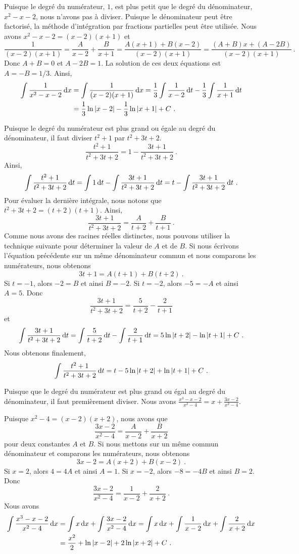{
Puisque le degré du numérateur, $1$, est plus petit que le degré du
dénominateur, $x^2-x -2$, nous n'avons pas à diviser.
Puisque le dénominateur peut être factorisé, la méthode d'intégration
par fractions partielles peut être utilisée.  Nous avons
$x^2 -x -2 = (x-2)(x+1)$ et
\[
\frac{1}{(x-2)(x+1)} = \frac{A}{x-2} + \frac{B}{x+1}
=\frac{A(x+1)+B(x-2)}{(x-2)(x+1)}
=\frac{(A+B)x + (A-2B)}{(x-2)(x+1)} \ .
\]
Donc $A+B=0$ et $A-2B=1$.  La solution de ces deux équations est
$A = -B = 1/3$.  Ainsi,
\begin{align*}
\int \frac{1}{x^2 -x -2} \,\mathrm{d}x &= \int \frac{1}{(x-2)(x+1)} \,\mathrm{d}x
= \frac{1}{3} \int \frac{1}{x-2} \,\mathrm{d}t
- \frac{1}{3} \int \frac{1}{x+1} \,\mathrm{d}t \\
&= \frac{1}{3} \ln|x-2| - \frac{1}{3} \ln|x+1| + C \ .
\end{align*}

Puisque le degré du numérateur est plus grand ou égale au degré du
dénominateur, il faut diviser $t^2+1$ par $t^2+3t+2$. 
\[
\frac{t^2+1}{t^2+3t+2} = 1 - \frac{3t+1}{t^2+3t+2} \ .
\]
Ainsi,
\[
\int \frac{t^2+1}{t^2+3t+2} \,\mathrm{d}t =
\int 1 \,\mathrm{d}t - \int \frac{3t+1}{t^2+3t+2} \,\mathrm{d}t
= t - \int \frac{3t+1}{t^2+3t+2} \,\mathrm{d}t \ .
\]
Pour évaluer la dernière intégrale, nous notons que $t^2+3t+2 = (t+2)(t+1)$.
Ainsi,
\[
\frac{3t+1}{t^2+3t+2} = \frac{A}{t+2} + \frac{B}{t+1} \ .
\]
Comme nous avons des racines réelles distinctes, nous pouvons utiliser
la technique suivante pour déterminer la valeur de $A$ et de $B$.  Si
nous écrivons l'équation précédente sur un même dénominateur commun et
nous comparons les numérateurs, nous obtenons
\[
3t+1 = A(t+1) + B(t+2) \ .
\]
Si $t=-1$, alors $-2 = B$ et ainsi $B=-2$.
Si $t=-2$, alors $-5 = -A$ et ainsi $A=5$.
Donc
\[
\frac{3t+1}{t^2+3t+2} = \frac{5}{t+2} - \frac{2}{t+1}
\]
et
\[
\int \frac{3t+1}{t^2+3t+2} \,\mathrm{d}t
= \int \frac{5}{t+2} \,\mathrm{d}t - \int \frac{2}{t+1} \,\mathrm{d}t
= 5 \ln|t+2| - \ln|t+1| +C \ .
\]
Nous obtenons finalement,
\[
\int \frac{t^2+1}{t^2+3t+2} \,\mathrm{d}t = t - 5 \ln|t+2| + \ln|t+1| +C \ .
\]

 Puisque que le degré du numérateur est plus grand ou égal au
degré du dénominateur, il faut premièrement diviser.  Nous avons
$\displaystyle \frac{x^3-x-2}{x^2-4} = x + \frac{3x-2}{x^2-4}$.

Puisque $x^2-4 = (x-2)(x+2)$, nous avons que
\[
\frac{3x-2}{x^2-4} = \frac{A}{x-2} + \frac{B}{x+2}
\]
pour deux constantes $A$ et $B$.  Si nous mettons sur un même commun
dénominateur et comparons les numérateurs, nous obtenons
\[
3x-2 = A(x+2) + B(x-2) \ .
\]
Si $x=2$, alors $4=4A$ et ainsi $A=1$.  Si $x=-2$, alors $-8 = -4B$ et
ainsi $B=2$.  Donc
\[
\frac{3x-2}{x^2-4} = \frac{1}{x-2} + \frac{2}{x+2} \ .
\]
Nous avons
\begin{align*}
\int \frac{x^3-x-2}{x^2-4} \,\mathrm{d}x
&= \int x \,\mathrm{d}x + \int \frac{3x-2}{x^2-4} \,\mathrm{d}x
= \int x \,\mathrm{d}x + \int \frac{1}{x-2} \,\mathrm{d}x
+ \int \frac{2}{x+2} \,\mathrm{d}x \\
&= \frac{x^2}{2} + \ln|x-2| +2 \ln|x+2| + C \ .
\end{align*}

}
